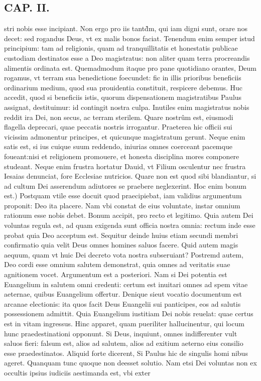 \documentclass{article}
\begin{document}
\begin{pages}
\section*{CAP. II. }
\marginpar{[ p.19 ]}\pstart stri nobis esse incipiant. Non ergo pro iis tantd̀m, qui iam digni sunt, orare nos decet: sed rogandus Deus, vt ex malis bonos faciat. Tenendum enim semper istud principium: tam ad religionis, quam ad tranquillitatis et honestatis publicae custodiam destinatos esse a Deo magistratus: non aliter quam terra procreandis alimentis ordinata est. Quemadmodum itaque pro pane quotidiano orantes, Deum rogamus, vt terram sua benedictione foecundet: fic in illis prioribus beneficiis ordinarium medium, quod sua prouidentia constituit, respicere debemus. Huc accedit, quod si beneficiis istis, quorum dispensationem magistratibus Paulus assignat, destituimur: id contingit nostra culpa. Inutiles enim magistratus nobis reddit ira Dei, non secus, ac terram sterilem. Quare nostrûm est, eiusmodi flagella deprecari, quae peccatis nostris irrogantur. Praeterea hic officii sui vicissim admonentur principes, et quicunque magistratum gerunt. Neque enim satis est, si ius cuique suum reddendo, iniurias omnes coerceant pacemque foueant:nisi et religionem promouere, et honesta disciplina mores componere studeant. Neque enim frustra hortatur Dauid, vt Filium osculentur nec frustra Iesaias denunciat, fore Ecclesiae nutricios. Quare non est quod sibi blandiantur, si ad cultum Dei asserendum adiutores se praebere neglexerint.  \pend\pstart Hoc enim bonum est.) Postquam vtile esse docuit quod praecipiebat, iam validius argumentum proponit: Deo ita placere. Nam vbi constat de eius voluntate, instar omnium rationum esse nobis debet. Bonum accipit, pro recto et legitimo. Quia autem Dei voluntas regula est, ad quam exigenda sunt officia nostra omnia: rectum inde esse probat quia Deo acceptum est. Sequitur deinde huius etiam secundi membri confirmatio quia velit Deus omnes homines saluos facere. Quid autem magis aequum, quam vt huic Dei decreto vota nostra subseruiant? Postremd autem, Deo cordi esse omnium salutem demonstrat, quia omnes ad veritatis suae agnitionem vocet. Argumentum est a posteriori. Nam si Dei potentia est Euangelium in salutem omni credenti: certum est inuitari omnes ad spem vitae aeternae, quibus Euangelium offertur. Denique sieut vocatio documentum est arcanae electionis: ita quos facit Deus Euangelii sui panticipes, eos ad salutis possessionem admittit. Quia Euangelium iustitiam Dei nobis reuelat: quae certus est in vitam ingressus. Hinc apparet, quam pueriliter hallucinentur, qui locum hunc praedestinationi opponunt. Si Deus, inquiunt, omnes indifferenter vult saluos fieri: falsum est, alios ad salutem, alios ad exitium aeterno eius consilio esse praedestinatos. Aliquid forte dicerent, Si Paulus hic de singulis homi nibus ageret. Quanquam tunc quoque non deesset solutio. Nam etsi Dei voluntas non ex occultis ipsius iudiciis aestimanda est, vbi exter  \pend

\end{pages}
\end{document}
